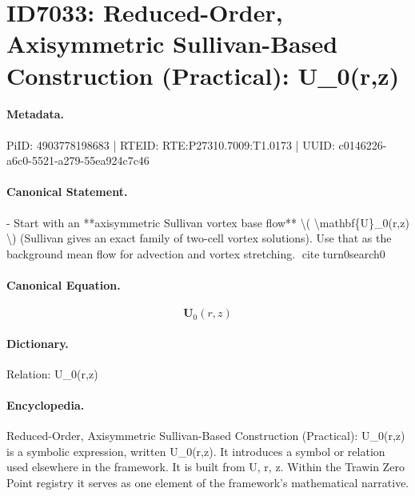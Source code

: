 \section*{ID7033: Reduced-Order, Axisymmetric Sullivan-Based Construction (Practical): U\_0(r,z)}
\paragraph{Metadata.}
PiID: 4903778198683 | RTEID: RTE:P27310.7009:T1.0173 | UUID: c0146226-a6c0-5521-a279-55ea924c7c46

\paragraph{Canonical Statement.}
- Start with an **axisymmetric Sullivan vortex base flow** \textbackslash{}( \textbackslash{}mathbf\{U\}\_0(r,z) \textbackslash{}) (Sullivan gives an exact family of two-cell vortex solutions). Use that as the background mean flow for advection and vortex stretching. citeturn0search0

\paragraph{Canonical Equation.}
\[
\mathbf{U}_0(r,z)
\]

\paragraph{Dictionary.}
Relation: U\_0(r,z)

\paragraph{Encyclopedia.}
Reduced-Order, Axisymmetric Sullivan-Based Construction (Practical): U\_0(r,z) is a symbolic expression, written U\_0(r,z). It introduces a symbol or relation used elsewhere in the framework. It is built from U, r, z. Within the Trawin Zero Point registry it serves as one element of the framework's mathematical narrative.
